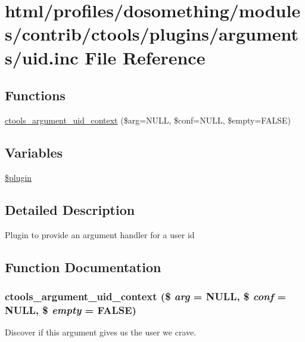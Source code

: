 \hypertarget{uid_8inc}{
\section{html/profiles/dosomething/modules/contrib/ctools/plugins/arguments/uid.inc File Reference}
\label{uid_8inc}
}
\subsection*{Functions}
\begin{DoxyCompactItemize}
\item 
\hyperlink{uid_8inc_a34b197765508df033c3e5cc5a0699b92}{ctools\_\-argument\_\-uid\_\-context} (\$arg=NULL, \$conf=NULL, \$empty=FALSE)
\end{DoxyCompactItemize}
\subsection*{Variables}
\begin{DoxyCompactItemize}
\item 
\hyperlink{uid_8inc_ada8a7130088351710bb02ed622d6bf65}{\$plugin}
\end{DoxyCompactItemize}


\subsection{Detailed Description}
Plugin to provide an argument handler for a user id 

\subsection{Function Documentation}
\hypertarget{uid_8inc_a34b197765508df033c3e5cc5a0699b92}{
\subsubsection[{ctools\_\-argument\_\-uid\_\-context}]{\setlength{\rightskip}{0pt plus 5cm}ctools\_\-argument\_\-uid\_\-context (\$ {\em arg} = {\ttfamily NULL}, \/  \$ {\em conf} = {\ttfamily NULL}, \/  \$ {\em empty} = {\ttfamily FALSE})}}
\label{uid_8inc_a34b197765508df033c3e5cc5a0699b92}
Discover if this argument gives us the user we crave. 

